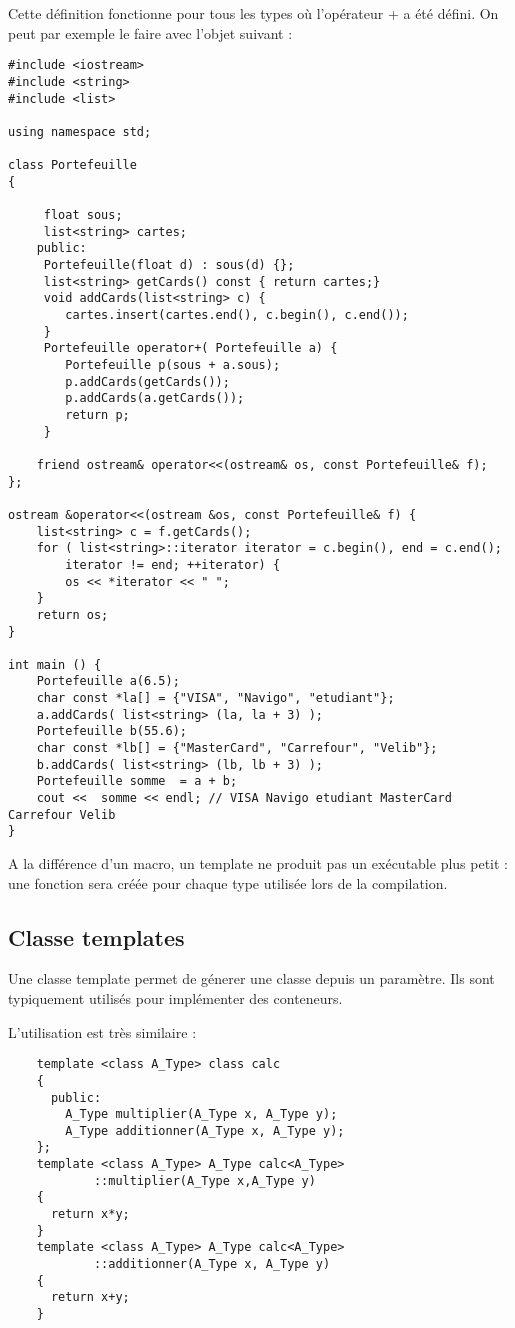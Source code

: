 \documentclass[abstracton]{scrartcl}
\begin{document}
Cette définition fonctionne pour tous les types où l'opérateur + a été défini. On peut par exemple le faire avec l'objet suivant :
\begin{lstlisting}
#include <iostream>
#include <string>
#include <list>

using namespace std;

class Portefeuille
{

     float sous;
     list<string> cartes;
    public:
     Portefeuille(float d) : sous(d) {};
     list<string> getCards() const { return cartes;}
     void addCards(list<string> c) {
        cartes.insert(cartes.end(), c.begin(), c.end());
     }
     Portefeuille operator+( Portefeuille a) {
        Portefeuille p(sous + a.sous);
        p.addCards(getCards());
        p.addCards(a.getCards());
        return p;
     }

    friend ostream& operator<<(ostream& os, const Portefeuille& f);
};

ostream &operator<<(ostream &os, const Portefeuille& f) {
    list<string> c = f.getCards();
    for ( list<string>::iterator iterator = c.begin(), end = c.end();
        iterator != end; ++iterator) {
        os << *iterator << " ";
    }
    return os;
}

int main () {
    Portefeuille a(6.5);
    char const *la[] = {"VISA", "Navigo", "etudiant"};
    a.addCards( list<string> (la, la + 3) );
    Portefeuille b(55.6);
    char const *lb[] = {"MasterCard", "Carrefour", "Velib"};
    b.addCards( list<string> (lb, lb + 3) );
    Portefeuille somme  = a + b;
    cout <<  somme << endl; // VISA Navigo etudiant MasterCard Carrefour Velib
}
\end{lstlisting}

A la différence d'un macro, un template ne produit pas un exécutable plus petit : une fonction sera créée pour chaque type utilisée lors de la compilation.



\subsection{Classe templates}

Une classe template permet de génerer une classe depuis un paramètre. Ils sont typiquement utilisés pour implémenter des conteneurs.

L'utilisation est très similaire :
\begin{lstlisting}
    template <class A_Type> class calc
    {
      public:
        A_Type multiplier(A_Type x, A_Type y);
        A_Type additionner(A_Type x, A_Type y);
    };
    template <class A_Type> A_Type calc<A_Type>
            ::multiplier(A_Type x,A_Type y)
    {
      return x*y;
    }
    template <class A_Type> A_Type calc<A_Type>
            ::additionner(A_Type x, A_Type y)
    {
      return x+y;
    }
\end{lstlisting}
\end{document}
